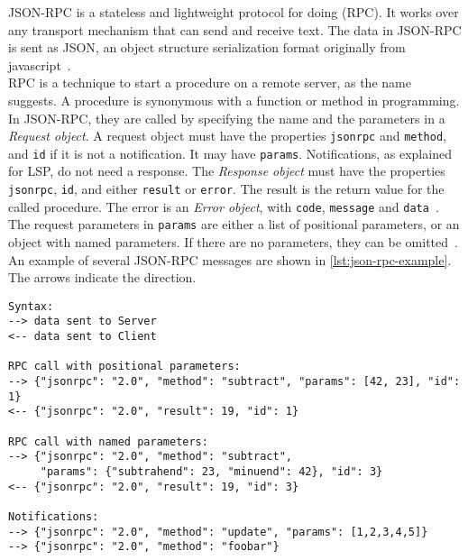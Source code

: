 
\Gls{JSON-RPC} is a stateless and lightweight protocol for doing  (\acrshort{RPC}).
It works over any transport mechanism that can send and receive text.
The data in \gls{JSON-RPC} is sent as \gls{JSON}, an object structure serialization format originally from javascript~\cite{json-rpcworkinggroupJSONRPCSpecification2010}.\\

\acrshort{RPC} is a technique to start a procedure on a remote server, as the name suggests.
A procedure is synonymous with a function or method in programming.
In \gls{JSON-RPC}, they are called by specifying the name and the parameters in a \textit{Request object}.
A request object must have the properties \texttt{jsonrpc} and \texttt{method}, and \texttt{id} if it is not a notification.
It may have \texttt{params}.
Notifications, as explained for \acrshort{LSP}, do not need a response.
The \textit{Response object} must have the properties \texttt{jsonrpc}, \texttt{id}, and either \texttt{result} or \texttt{error}.
The result is the return value for the called procedure.
The error is an \textit{Error object}, with \texttt{code}, \texttt{message} and \texttt{data}~\cite{json-rpcworkinggroupJSONRPCSpecification2010}.\\

The request parameters in \texttt{params} are either a list of positional parameters, or an object with named parameters.
If there are no parameters, they can be omitted~\cite{json-rpcworkinggroupJSONRPCSpecification2010}.
An example of several \gls{JSON-RPC} messages are shown in \cref{lst:json-rpc-example}.
The arrows indicate the direction.

\begin{lstlisting}[caption={JSON-RPC examples copied from \cite{json-rpcworkinggroupJSONRPCSpecification2010}.}, label={lst:json-rpc-example}]
Syntax:
--> data sent to Server
<-- data sent to Client

RPC call with positional parameters:
--> {"jsonrpc": "2.0", "method": "subtract", "params": [42, 23], "id": 1}
<-- {"jsonrpc": "2.0", "result": 19, "id": 1}

RPC call with named parameters:
--> {"jsonrpc": "2.0", "method": "subtract", 
     "params": {"subtrahend": 23, "minuend": 42}, "id": 3}
<-- {"jsonrpc": "2.0", "result": 19, "id": 3}

Notifications:
--> {"jsonrpc": "2.0", "method": "update", "params": [1,2,3,4,5]}
--> {"jsonrpc": "2.0", "method": "foobar"}
\end{lstlisting}

